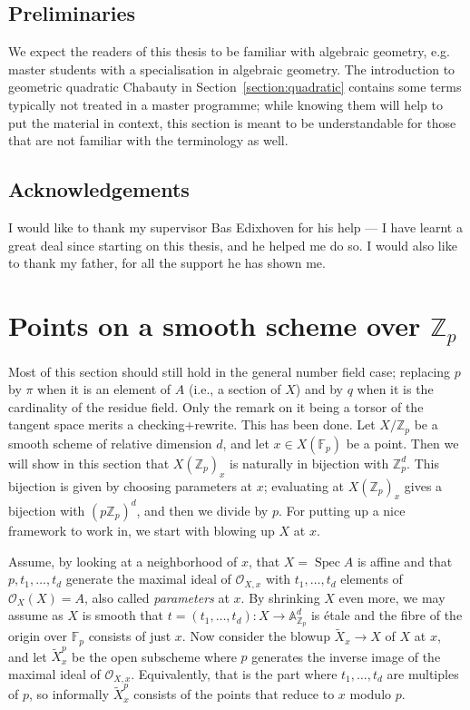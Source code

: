 \documentclass[12pt]{article}
\newcommand{\A}{\mathbb{A}}
\newcommand{\Z}{\mathbb{Z}}
\renewcommand{\O}{\mathcal{O}}
\newcommand{\F}{\mathbb{F}}
\DeclareMathOperator{\Spec}{Spec}
\theoremstyle{plain}
\theoremstyle{definition}
\theoremstyle{remark}
\begin{document}
\subsection{Preliminaries}
We expect the readers of this thesis to be familiar with algebraic geometry, e.g. master students with a specialisation in algebraic geometry. The introduction to geometric quadratic Chabauty in Section~\ref{section:quadratic} contains some terms typically not treated in a master programme; while knowing them will help to put the material in context, this section is meant to be understandable for those that are not familiar with the terminology as well.

\subsection{Acknowledgements}
I would like to thank my supervisor Bas Edixhoven for his help --- I have learnt a great deal since starting on this thesis, and he helped me do so. I would also like to thank my father, for all the support he has shown me.

\newpage
\section{Points on a smooth scheme over \texorpdfstring{$\Z_p$}{Z\_p}}
\label{section:smoothzppoints}
{\color{red} Most of this section should still hold in the general number field case; replacing $p$ by $\pi$ when it is an element of $A$ (i.e., a section of $X$) and by $q$ when it is the cardinality of the residue field. Only the remark on it being a torsor of the tangent space merits a checking+rewrite. This has been done.}
Let $X/\Z_p$ be a smooth scheme of relative dimension $d$, and let $x \in X(\F_p)$ be a point. Then we will show in this section that $X(\Z_p)_x$ is naturally in bijection with $\Z_p^d$. This bijection is given by choosing parameters at $x$; evaluating at $X(\Z_p)_x$ gives a bijection with $(p\Z_p)^d$, and then we divide by $p$. For putting up a nice framework to work in, we start with blowing up $X$ at $x$.

Assume, by looking at a neighborhood of $x$, that $X = \Spec A$ is affine and that $p,t_1,\dots,t_d$ generate the maximal ideal of $\O_{X,x}$ with $t_1,\dots,t_d$ elements of $\O_X(X) = A$, also called \textit{parameters} at $x$. By shrinking $X$ even more, we may assume as $X$ is smooth that $t = (t_1,\dots,t_d): X \to \A^d_{\Z_p}$ is \'etale and the fibre of the origin over $\F_p$ consists of just $x$. Now consider the blowup $\widetilde{X}_x \to X$ of $X$ at $x$, and let $\widetilde{X}_x^p$ be the open subscheme where $p$ generates the inverse image of the maximal ideal of $\O_{X,x}$. Equivalently, that is the part where $t_1,\dots,t_d$ are multiples of $p$, so informally $\widetilde{X}_x^p$ consists of the points that reduce to $x$ modulo $p$.
\end{document}
